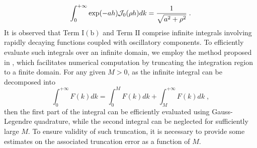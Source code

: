 \begin{equation}\label{eq...text...TermI(A)}
    \int_0^{+\infty}   \exp(-ah) \mathcal{J}_0(\rho h)d k=\frac{1}{\sqrt{a^2+\rho^2}}\;.
\end{equation}
It is observed that Term $\mathrm{I(b)}$ and Term $\mathrm{II}$  comprise infinite integrals involving rapidly decaying functions coupled with oscillatory components. To efficiently evaluate such integrals over an infinite domain, we employ the method proposed in \cite{trefethen2022exactness}, which facilitates numerical computation by truncating the integration region to a finite domain. 
For any given 
$M>0$, as the infinite integral can be decomposed into
\begin{equation*}
 \int_0^{+\infty} F(k)d  k=  \int_0^{M} F(k)d  k+\int_M^{+\infty} F(k)d  k\;,
\end{equation*}
then the first part of the integral can be efficiently evaluated  using  Gauss-Legendre quadrature, while the second integral can be neglected for sufficiently large $M$. To ensure   validity of such truncation, it is necessary to provide some  estimates on the associated truncation error as a function of $M$.
